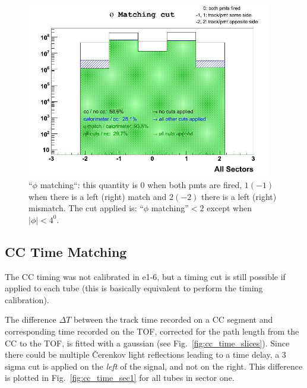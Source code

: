 \vspace{1.3cm}
\begin{figure}[h]
  \centering
		\includegraphics[width=0.95\textwidth]{img/phi_match_all_sectors.jpg}
		\caption{``$\phi$ matching``: this quantity is $0$ when both pmts are fired, $1(-1)$ when
there is a left (right) match and $2(-2)$ there is a left (right) mismatch.
The cut applied is:  ``$\phi$ matching''$<2$ except when $|\phi|<4^0$.}
 		\label{fig:ccm_phi}
\end{figure}

\clearpage\newpage

\subsection{CC Time Matching}
The CC timing was not calibrated in e1-6, but a timing cut is still possible if applied to each tube
(this is basically equivalent to perform the timing calibration).

The difference $\Delta T$ between the track time recorded on a CC segment and corresponding time recorded on the TOF,
corrected for the path length from the CC to the TOF, is fitted with a gaussian (see Fig.~\ref{fig:cc_time_slices}).
Since there could be multiple \v Cerenkov light reflections leading to a time delay,
a 3 sigma cut is applied on the {\it left} of the signal, and not on the right.
This difference is plotted in Fig.~\ref{fig:cc_time_sec1} for all tubes in sector one.

